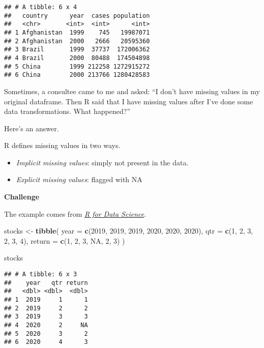 \documentclass[
]{book}
\newenvironment{Shaded}{\begin{snugshade}}{\end{snugshade}}
\newcommand{\DataTypeTok}[1]{\textcolor[rgb]{0.13,0.29,0.53}{#1}}
\newcommand{\DecValTok}[1]{\textcolor[rgb]{0.00,0.00,0.81}{#1}}
\newcommand{\KeywordTok}[1]{\textcolor[rgb]{0.13,0.29,0.53}{\textbf{#1}}}
\newcommand{\NormalTok}[1]{#1}
\newcommand{\OtherTok}[1]{\textcolor[rgb]{0.56,0.35,0.01}{#1}}
\newcommand{\StringTok}[1]{\textcolor[rgb]{0.31,0.60,0.02}{#1}}
\begin{document}
\begin{verbatim}
## # A tibble: 6 x 4
##   country      year  cases population
##   <chr>       <int>  <int>      <int>
## 1 Afghanistan  1999    745   19987071
## 2 Afghanistan  2000   2666   20595360
## 3 Brazil       1999  37737  172006362
## 4 Brazil       2000  80488  174504898
## 5 China        1999 212258 1272915272
## 6 China        2000 213766 1280428583
\end{verbatim}

Sometimes, a consultee came to me and asked: ``I don't have missing values in my original dataframe. Then R said that I have missing values after I've done some data transformations. What happened?''

Here's an answer.

R defines missing values in two ways.

\begin{itemize}
\item
  \emph{Implicit missing values}: simply not present in the data.
\item
  \emph{Explicit missing values}: flagged with NA
\end{itemize}

\textbf{Challenge}

The example comes from \href{https://r4ds.had.co.nz/tidy-data.html}{\emph{R for Data Science}}.

\begin{Shaded}
\begin{Highlighting}[]
\NormalTok{stocks \textless{}{-}}\StringTok{ }\KeywordTok{tibble}\NormalTok{(}
  \DataTypeTok{year =} \KeywordTok{c}\NormalTok{(}\DecValTok{2019}\NormalTok{, }\DecValTok{2019}\NormalTok{, }\DecValTok{2019}\NormalTok{, }\DecValTok{2020}\NormalTok{, }\DecValTok{2020}\NormalTok{, }\DecValTok{2020}\NormalTok{),}
  \DataTypeTok{qtr =} \KeywordTok{c}\NormalTok{(}\DecValTok{1}\NormalTok{, }\DecValTok{2}\NormalTok{, }\DecValTok{3}\NormalTok{, }\DecValTok{2}\NormalTok{, }\DecValTok{3}\NormalTok{, }\DecValTok{4}\NormalTok{),}
  \DataTypeTok{return =} \KeywordTok{c}\NormalTok{(}\DecValTok{1}\NormalTok{, }\DecValTok{2}\NormalTok{, }\DecValTok{3}\NormalTok{, }\OtherTok{NA}\NormalTok{, }\DecValTok{2}\NormalTok{, }\DecValTok{3}\NormalTok{)}
\NormalTok{)}

\NormalTok{stocks}
\end{Highlighting}
\end{Shaded}

\begin{verbatim}
## # A tibble: 6 x 3
##    year   qtr return
##   <dbl> <dbl>  <dbl>
## 1  2019     1      1
## 2  2019     2      2
## 3  2019     3      3
## 4  2020     2     NA
## 5  2020     3      2
## 6  2020     4      3
\end{verbatim}
\end{document}
